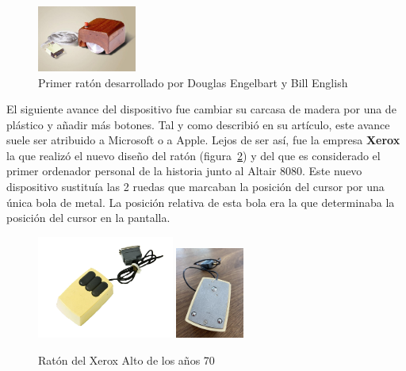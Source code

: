 \begin{figure}[t]
\centering
\includegraphics[width=0.29\textwidth]{./Imagenes/Bitmap/Primer_raton.jpg}
\caption{Primer rat\'on desarrollado por Douglas Engelbart y Bill English}
\label{Fig:primerraton}
\end{figure}

El siguiente avance del dispositivo fue cambiar su carcasa de madera por una de pl\'astico y a\~nadir m\'as botones. Tal y como describi\'o \cite{xerox} en su art\'iculo, este avance suele ser atribuido a Microsoft o a Apple. Lejos de ser as\'i, fue la empresa \textbf{Xerox} la que realiz\'o el nuevo dise\~no del rat\'on (figura~\ref{Fig:xerox}) y del que es considerado el primer ordenador personal de la historia junto al Altair 8080. Este nuevo dispositivo sustitu\'ia las 2 ruedas que marcaban la posici\'on del cursor por una \'unica bola de metal. La posici\'on relativa de esta bola era la que determinaba la posici\'on del cursor en la pantalla. \\

\begin{figure}[t]
\begin{minipage}{0.9\textwidth}
    \centering
    \includegraphics[width=0.40\textwidth]{./Imagenes/Bitmap/mouse_xerox_alto(1).png}
    \includegraphics[width=0.20\textwidth]{./Imagenes/Bitmap/mouse_xerox_alto(2).jpg}
\end{minipage}
    \caption{Rat\'on del Xerox Alto de los a\~nos 70}
\label{Fig:xerox}
\end{figure}

